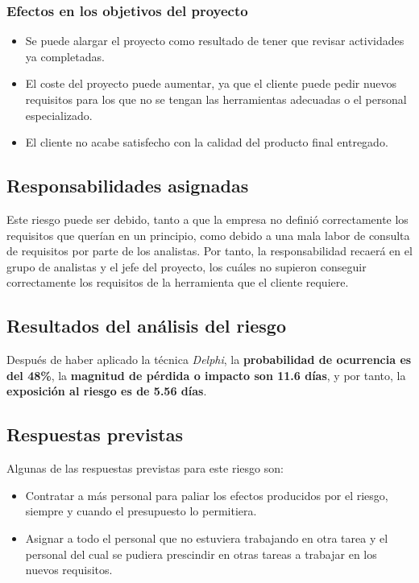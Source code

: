\documentclass[11pt,a4paper,spanish,twoside]{book}
\begin{document}
\subsubsection{Efectos en los objetivos del proyecto}
\begin{itemize}
\item Se puede alargar el proyecto como resultado de tener que revisar 
  actividades ya completadas.
\item El coste del proyecto puede aumentar, ya que el cliente puede pedir 
  nuevos requisitos para los que no se tengan las herramientas adecuadas o el 
  personal especializado.
\item El cliente no acabe satisfecho con la calidad del producto final
  entregado.
\end{itemize}

\subsection{Responsabilidades asignadas}
Este riesgo puede ser debido, tanto a que la empresa no definió correctamente
los requisitos que querían en un principio, como debido a una mala labor de
consulta de requisitos por parte de los analistas. Por tanto, la
responsabilidad recaerá en el grupo de analistas y el jefe del proyecto, los
cuáles no supieron conseguir correctamente los requisitos de la herramienta
que el cliente requiere.

\subsection{Resultados del análisis del riesgo}
Después de haber aplicado la técnica \emph{Delphi}, la \textbf{probabilidad de
ocurrencia es del 48\%}, la \textbf{magnitud de pérdida o impacto son 11.6
días}, y por tanto, la \textbf{exposición al riesgo es de 5.56 días}.

\subsection{Respuestas previstas}
Algunas de las respuestas previstas para este riesgo son:
\begin{itemize}
\item Contratar a más personal para paliar los efectos producidos por el
  riesgo, siempre y cuando el presupuesto lo permitiera.
\item Asignar a todo el personal que no estuviera trabajando en otra tarea y
  el personal del cual se pudiera prescindir en otras tareas a trabajar en los 
  nuevos requisitos.
\end{itemize}
\end{document}
